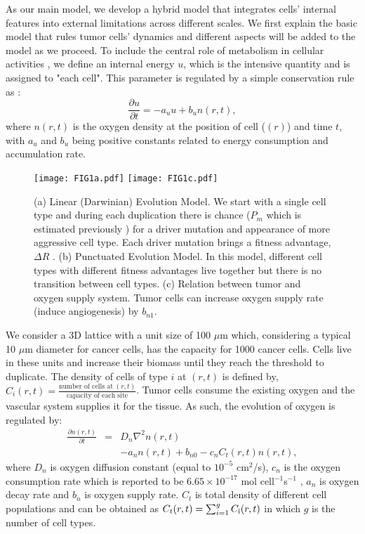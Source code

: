 \documentclass[aps,prl, superscriptaddress,groupedaddress]{revtex4}  %
\begin{document}
	As our main model, we develop a hybrid model that integrates cells' internal features into external limitations across different scales. We first explain the basic model that rules tumor cells' dynamics and different aspects will be added to the model as we proceed. To include the central role of metabolism in cellular activities \cite{buchakjian2010engine}, we define an internal energy $u$, which is the intensive quantity and is assigned to "each cell". This parameter is regulated by a simple conservation rule as \cite{scalerandi2002inhibition, azimzade2018role}:  
	\begin{equation}
		\frac{\partial u}{\partial t}= -a_u u + b_u n(r,t),
		\label{Eq1}
	\end{equation}
	where $n(r,t)$ is the oxygen density at the position of cell ($(r)$) and time $t$, with $a_u$ and  $b_u$ being positive constants related to energy consumption and accumulation rate.
	
	\begin{figure} 
		\centering
		\texttt{[image: FIG1a.pdf]} 
		\texttt{[image: FIG1c.pdf]}   
		\caption{ (a) Linear (Darwinian) Evolution Model. We start with a single cell type and during each duplication there is chance ($P_m$ which is estimated previously \cite{bozic2010accumulation}) for a driver mutation and appearance of more aggressive cell type. Each driver mutation brings a fitness advantage, $\Delta R$ \cite{bozic2010accumulation}. (b) Punctuated Evolution Model. In this model, different cell types with different fitness advantages live together but there is no transition between cell types. (c) Relation between tumor and oxygen supply system. Tumor cells can increase oxygen supply rate (induce angiogenesis) by $b_{n1}$.}
		\label{FIG1}
	\end{figure}
	
	We consider a 3D lattice with a unit size of 100 $\mu$m which, considering a typical 10 $\mu$m diameter for cancer cells, has the capacity for 1000 cancer cells. Cells live in these units and increase their biomass until they reach the threshold to duplicate. The density of cells of type $i$ at $(r,t)$ is defined by, $C_i(r,t)=\frac{\text{number of cells at}\;(r,t)}{\text{capacity of each site}}$. Tumor cells consume the existing oxygen and the vascular system supplies it for the tissue. As such, the evolution of oxygen is regulated by:
	\begin{eqnarray}
		\frac{\partial n(r,t)}{\partial t}&=&D_n\nabla^2 n(r,t)\\&&- a_n n(r,t)+ b_{n0}- c_n C_t(r,t) n(r,t)\nonumber,
		\label{Eq2}
	\end{eqnarray}
	where $D_n$ is oxygen diffusion constant (equal to $10^{-5}$ cm$^2$/s), $c_n$ is the oxygen consumption rate which is reported to be $6.65\times 10^{-17}$ mol cell$^{-1}$s$^{-1}$ \cite{anderson2005hybrid}, $a_n$ is oxygen decay rate and $b_n$ is oxygen supply rate. $C_t$ is total density of different cell populations and can be obtained as $C_t(r,t)=\sum^g_{i=1} C_{\rm i}(r,t)$ in which $g$ is the number of cell types. 
	
\end{document}
